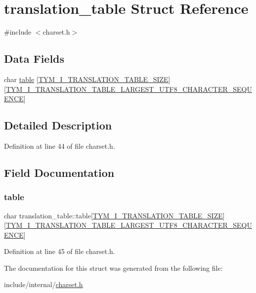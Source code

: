\hypertarget{structtranslation__table}{}\section{translation\+\_\+table Struct Reference}
\label{structtranslation__table}


{\ttfamily \#include $<$charset.\+h$>$}

\subsection*{Data Fields}
\begin{DoxyCompactItemize}
\item 
char \hyperlink{structtranslation__table_abc27dc6c1889e84c3b0937bcef5325e9}{table} \mbox{[}\hyperlink{charset_8h_a99fb83031ce9923c84392b4e92f956b5a825d7047f7af75e3411c5c31f489c546}{T\+Y\+M\+\_\+\+I\+\_\+\+T\+R\+A\+N\+S\+L\+A\+T\+I\+O\+N\+\_\+\+T\+A\+B\+L\+E\+\_\+\+S\+I\+ZE}\mbox{]}\mbox{[}\hyperlink{charset_8h_a99fb83031ce9923c84392b4e92f956b5ac96e3ecb3b2dc9625a07967f6b91cf64}{T\+Y\+M\+\_\+\+I\+\_\+\+T\+R\+A\+N\+S\+L\+A\+T\+I\+O\+N\+\_\+\+T\+A\+B\+L\+E\+\_\+\+L\+A\+R\+G\+E\+S\+T\+\_\+\+U\+T\+F8\+\_\+\+C\+H\+A\+R\+A\+C\+T\+E\+R\+\_\+\+S\+E\+Q\+U\+E\+N\+CE}\mbox{]}
\end{DoxyCompactItemize}


\subsection{Detailed Description}


Definition at line 44 of file charset.\+h.



\subsection{Field Documentation}
\mbox{\label{structtranslation__table_abc27dc6c1889e84c3b0937bcef5325e9}} 
\subsubsection{\texorpdfstring{table}{table}}
{\footnotesize\ttfamily char translation\+\_\+table\+::table\mbox{[}\hyperlink{charset_8h_a99fb83031ce9923c84392b4e92f956b5a825d7047f7af75e3411c5c31f489c546}{T\+Y\+M\+\_\+\+I\+\_\+\+T\+R\+A\+N\+S\+L\+A\+T\+I\+O\+N\+\_\+\+T\+A\+B\+L\+E\+\_\+\+S\+I\+ZE}\mbox{]}\mbox{[}\hyperlink{charset_8h_a99fb83031ce9923c84392b4e92f956b5ac96e3ecb3b2dc9625a07967f6b91cf64}{T\+Y\+M\+\_\+\+I\+\_\+\+T\+R\+A\+N\+S\+L\+A\+T\+I\+O\+N\+\_\+\+T\+A\+B\+L\+E\+\_\+\+L\+A\+R\+G\+E\+S\+T\+\_\+\+U\+T\+F8\+\_\+\+C\+H\+A\+R\+A\+C\+T\+E\+R\+\_\+\+S\+E\+Q\+U\+E\+N\+CE}\mbox{]}}



Definition at line 45 of file charset.\+h.



The documentation for this struct was generated from the following file\+:\begin{DoxyCompactItemize}
\item 
include/internal/\hyperlink{charset_8h}{charset.\+h}\end{DoxyCompactItemize}
